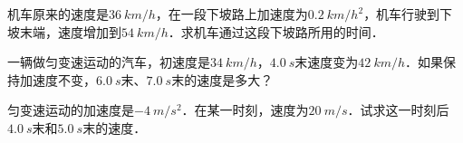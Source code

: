 \begin{Exercise}
	\begin{QsNum}
	    \item 机车原来的速度是$\qty{36}{km/h}$，在一段下坡路上加速度为$\qty{0.2}{km/h^2}$，机车行驶到下坡末端，速度增加到$\qty{54}{km/h}$．求机车通过这段下坡路所用的时间．
	    \item 一辆做匀变速运动的汽车，初速度是$\qty{34}{km/h}$，$\qty{4.0}{s}$末速度变为$\qty{42}{km/h}$．如果保持加速度不变，$\qty{6.0}{s}$末、$\qty{7.0}{s}$末的速度是多大？
	    \item 匀变速运动的加速度是$\qty{-4}{m/s^2}$．在某一时刻，速度为$\qty{20}{m/s}$．试求这一时刻后$\qty{4.0}{s}$末和$\qty{5.0}{s}$末的速度．
    \end{QsNum}
\end{Exercise}






